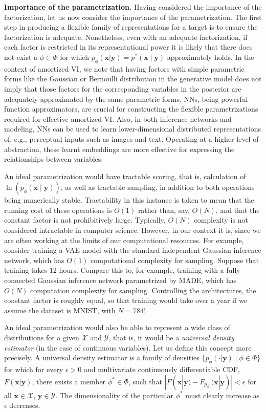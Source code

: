 {\bfseries Importance of the parametrization.} Having considered the importance of the factorization, let us now consider the importance of the parametrization. The first step in producing a flexible family of representations for a target is to ensure the factorization is adequate. Nonetheless, even with an adequate factorization, if each factor is restricted in its representational power it is likely that there does not exist a $\phi\in\Phi$ for which $p_\phi(\mathbf{x}|\mathbf{y})=p^*(\mathbf{x}\mid\mathbf{y})$ approximately holds. In the context of amortized VI, we note that having factors with simple parametric forms like the Gaussian or Bernoulli distribution in the generative model does not imply that those factors for the corresponding variables in the posterior are adequately approximated by the same parametric forms. NNs, being powerful function approximators, are crucial for constructing the flexible parametrizations required for effective amortized VI. Also, in both inference networks and modeling, NNs can be used to learn lower-dimensional distributed representations of, e.g., perceptual inputs such as images and text. Operating at a higher level of abstraction, these learnt embeddings are more effective for expressing the relationships between variables.


An ideal parametrization would have tractable scoring, that is, calculation of $\ln(p_\phi(\mathbf{x}\mid\mathbf{y}))$, as well as tractable sampling, in addition to both operations being numerically stable. Tractability in this instance is taken to mean that the running cost of these operations is $O(1)$ rather than, say, $O(N)$, and that the constant factor is not prohibitively large. Typically, $O(N)$ complexity is not considered intractable in computer science. However, in our context it is, since we are often working at the limits of our computational resources. For example, consider training a VAE model with the standard independent Gaussian inference network, which has $O(1)$ computational complexity for sampling. Suppose that training takes 12 hours. Compare this to, for example, training with a fully-connected Gaussian inference network parametrized by MADE, which has $O(N)$ computation complexity for sampling. Controlling the architectures, the constant factor is roughly equal, so that training would take over a year if we assume the dataset is MNIST, with $N=784$!

An ideal parametrization would also be able to represent a wide class of distributions for a given $\mathcal{X}$ and $\mathcal{Y}$, that is, it would be a \emph{universal density estimator} (in the case of continuous variables). Let us define this concept more precisely. A universal density estimator is a family of densities $\{p_\phi(\cdot|\mathbf{y})\mid \phi\in\Phi\}$ for which for every $\epsilon>0$ and multivariate continuously differentiable CDF, $F(\mathbf{x}|\mathbf{y})$, there exists a member $\phi^*\in\Phi$, such that $|F(\mathbf{x}|\mathbf{y})-F_{p_{\phi^*}}(\mathbf{x}|\mathbf{y})|<\epsilon$ for all $\mathbf{x}\in\mathcal{X}$, $\mathbf{y}\in\mathcal{Y}$. The dimensionality of the particular $\phi^*$ must clearly increase as $\epsilon$ decreases.

